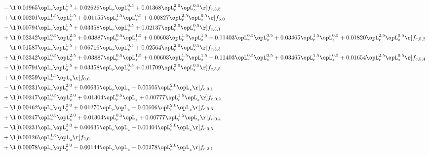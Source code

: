 \begin{alignat}{2}
& - \l[  0.01965 \opL_r \opL_z^{1.5} +  0.02626 \opL_r \opL_z^{0.5} +  0.01368 \opL_r^{2.0} \opL_z^{0.5}  \r] f_{c,3,5} \nonumber \\ 
& + \l[  0.00201 \opL_r^{1.5} \opL_z^{1.5} +  0.01155 \opL_r^{1.5} \opL_z^{0.5} +  0.00827 \opL_r^{2.5} \opL_z^{0.5}  \r] f_{5,0} \nonumber \\ 
& - \l[  0.00794 \opL_r \opL_z^{1.5} +  0.03358 \opL_r \opL_z^{0.5} +  0.02137 \opL_r^{2.0} \opL_z^{0.5}  \r] f_{c,5,1} \nonumber \\ 
& + \l[  0.02342 \opL_r^{0.5} \opL_z^{2.5} +  0.03887 \opL_r^{0.5} \opL_z^{1.5} +  0.00603 \opL_r^{1.5} \opL_z^{1.5} +  0.11403 \opL_r^{0.5} \opL_z^{0.5} +  0.03465 \opL_r^{1.5} \opL_z^{0.5} +  0.01820 \opL_r^{2.5} \opL_z^{0.5}  \r] f_{c,5,2} \nonumber \\ 
& - \l[  0.01587 \opL_r \opL_z^{1.5} +  0.06716 \opL_r \opL_z^{0.5} +  0.02564 \opL_r^{2.0} \opL_z^{0.5}  \r] f_{c,5,3} \nonumber \\ 
& + \l[  0.02342 \opL_r^{0.5} \opL_z^{2.5} +  0.03887 \opL_r^{0.5} \opL_z^{1.5} +  0.00603 \opL_r^{1.5} \opL_z^{1.5} +  0.11403 \opL_r^{0.5} \opL_z^{0.5} +  0.03465 \opL_r^{1.5} \opL_z^{0.5} +  0.01654 \opL_r^{2.5} \opL_z^{0.5}  \r] f_{c,5,4} \nonumber \\ 
& - \l[  0.00794 \opL_r \opL_z^{1.5} +  0.03358 \opL_r \opL_z^{0.5} +  0.01709 \opL_r^{2.0} \opL_z^{0.5}  \r] f_{c,5,5} \nonumber \\ 
& + \l[  0.00259 \opL_r^{1.5} \opL_z  \r] f_{0,0} \nonumber \\ 
& - \l[  0.00231 \opL_r \opL_z^{2.0} +  0.00635 \opL_r \opL_z +  0.00505 \opL_r^{2.0} \opL_z  \r] f_{c,0,1} \nonumber \\ 
& + \l[  0.00247 \opL_r^{0.5} \opL_z^{2.0} +  0.01304 \opL_r^{0.5} \opL_z +  0.00777 \opL_r^{1.5} \opL_z  \r] f_{c,0,2} \nonumber \\ 
& - \l[  0.00462 \opL_r \opL_z^{2.0} +  0.01270 \opL_r \opL_z +  0.00606 \opL_r^{2.0} \opL_z  \r] f_{c,0,3} \nonumber \\ 
& + \l[  0.00247 \opL_r^{0.5} \opL_z^{2.0} +  0.01304 \opL_r^{0.5} \opL_z +  0.00777 \opL_r^{1.5} \opL_z  \r] f_{c,0,4} \nonumber \\ 
& - \l[  0.00231 \opL_r \opL_z^{2.0} +  0.00635 \opL_r \opL_z +  0.00404 \opL_r^{2.0} \opL_z  \r] f_{c,0,5} \nonumber \\ 
& + \l[  0.00126 \opL_r^{1.5} \opL_z  \r] f_{2,0} \nonumber \\ 
& + \l[  0.00078 \opL_r \opL_z^{2.0}   -0.00144 \opL_r \opL_z   -0.00278 \opL_r^{2.0} \opL_z  \r] f_{c,2,1} \nonumber \\ 

\end{alignat}
